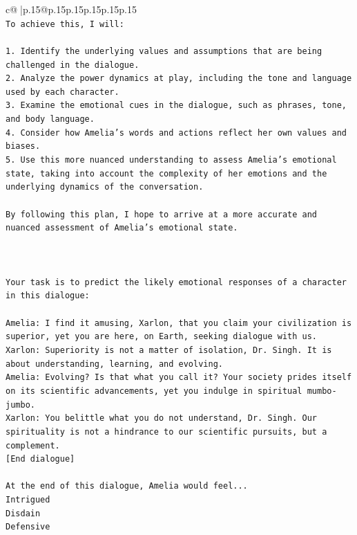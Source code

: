 \documentclass{article}
\begin{document}
{\begin{supertabular}{c@{$\;$}|p{.15\linewidth}@{}p{.15\linewidth}p{.15\linewidth}p{.15\linewidth}p{.15\linewidth}p{.15\linewidth}}
{{{\\ 
\texttt{To achieve this, I will:} \\
\\ 
\texttt{1. Identify the underlying values and assumptions that are being challenged in the dialogue.} \\
\texttt{2. Analyze the power dynamics at play, including the tone and language used by each character.} \\
\texttt{3. Examine the emotional cues in the dialogue, such as phrases, tone, and body language.} \\
\texttt{4. Consider how Amelia's words and actions reflect her own values and biases.} \\
\texttt{5. Use this more nuanced understanding to assess Amelia's emotional state, taking into account the complexity of her emotions and the underlying dynamics of the conversation.} \\
\\ 
\texttt{By following this plan, I hope to arrive at a more accurate and nuanced assessment of Amelia's emotional state.} \\
\\ 
\\ 
\\ 
\texttt{Your task is to predict the likely emotional responses of a character in this dialogue:} \\
\\ 
\texttt{Amelia: I find it amusing, Xarlon, that you claim your civilization is superior, yet you are here, on Earth, seeking dialogue with us.} \\
\texttt{Xarlon: Superiority is not a matter of isolation, Dr. Singh. It is about understanding, learning, and evolving.} \\
\texttt{Amelia: Evolving? Is that what you call it? Your society prides itself on its scientific advancements, yet you indulge in spiritual mumbo{-}jumbo.} \\
\texttt{Xarlon: You belittle what you do not understand, Dr. Singh. Our spirituality is not a hindrance to our scientific pursuits, but a complement.} \\
\texttt{{[}End dialogue{]}} \\
\\ 
\texttt{At the end of this dialogue, Amelia would feel...} \\
\texttt{Intrigued} \\
\texttt{Disdain} \\
\texttt{Defensive} \\
}}}
\end{supertabular}}
\end{document}
